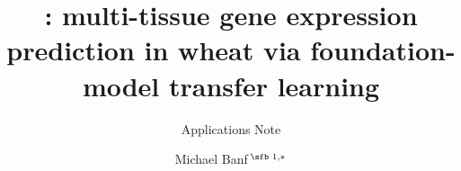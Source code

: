 \documentclass[nocrop]{bioinfo}
\begin{document}

\subtitle{Applications Note}

\title[PLANTED]{\mytool: multi-tissue gene expression prediction in wheat via foundation-model transfer learning}
\author[Banf \textit{et~al}.]{Michael Banf\,$^{\text{\sfb 1,}*}$}
\address{$^{\text{\sf 1}}$Affiliation placeholder}






\maketitle






\vspace*{-10pt}


\vspace*{-12pt}


\vspace*{-12pt}


\end{document}
